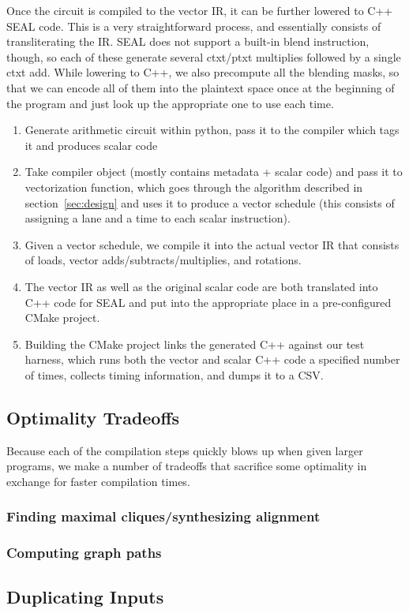 Once the circuit is compiled to the vector IR, it can be further lowered to C++ SEAL code.
This is a very straightforward process, and essentially consists of transliterating the IR. 
SEAL does not support a built-in blend instruction, though, so each of these generate several ctxt/ptxt multiplies followed by a single ctxt add.
While lowering to C++, we also precompute all the blending masks, so that we can encode all of them into the plaintext space once at the beginning of the program and just look up the appropriate one to use each time.

\begin{enumerate}
    \item Generate arithmetic circuit within python, pass it to the compiler which tags it and produces scalar code
    \item Take compiler object (mostly contains metadata + scalar code) and pass it to vectorization function, which goes through the algorithm described in section~\ref{sec:design} and uses it to produce a vector schedule (this consists of assigning a lane and a time to each scalar instruction).
    \item Given a vector schedule, we compile it into the actual vector IR that consists of loads, vector adds/subtracts/multiplies, and rotations.
    \item The vector IR as well as the original scalar code are both translated into C++ code for SEAL and put into the appropriate place in a pre-configured CMake project.
    \item Building the CMake project links the generated C++ against our test harness, which runs both the vector and scalar C++ code a specified number of times, collects timing information, and dumps it to a CSV.
\end{enumerate}

\subsection{Optimality Tradeoffs}
Because each of the compilation steps quickly blows up when given larger programs, we make a number of tradeoffs that sacrifice some optimality in exchange for faster compilation times.
\subsubsection*{Finding maximal cliques/synthesizing alignment}
\subsubsection*{Computing graph paths}

\subsection{Duplicating Inputs}